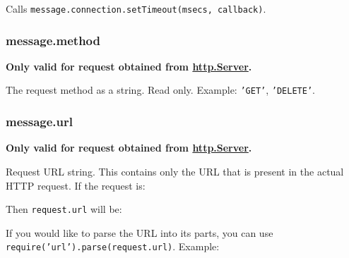 Calls \texttt{message.connection.setTimeout(msecs, callback)}.

\subsubsection{message.method}\label{message.method}

\textbf{Only valid for request obtained from
\hyperref[httpux5fclassux5fhttpux5fserver]{http.Server}.}

The request method as a string. Read only. Example: \texttt{'GET'},
\texttt{'DELETE'}.

\subsubsection{message.url}\label{message.url}

\textbf{Only valid for request obtained from
\hyperref[httpux5fclassux5fhttpux5fserver]{http.Server}.}

Request URL string. This contains only the URL that is present in the
actual HTTP request. If the request is:

\begin{Shaded}
\begin{Highlighting}[]
\end{Highlighting}
\end{Shaded}

Then \texttt{request.url} will be:

\begin{Shaded}
\begin{Highlighting}[]
\end{Highlighting}
\end{Shaded}

If you would like to parse the URL into its parts, you can use
\texttt{require('url').parse(request.url)}. Example:

\begin{Shaded}
\begin{Highlighting}[]
\NormalTok{(}\NormalTok{(}\NormalTok{)}
\NormalTok{\{ }\NormalTok{: }\NormalTok{,}
  \NormalTok{: }\NormalTok{,}
  \NormalTok{: }\NormalTok{,}
  \NormalTok{: } \NormalTok{\}}
\end{Highlighting}
\end{Shaded}

